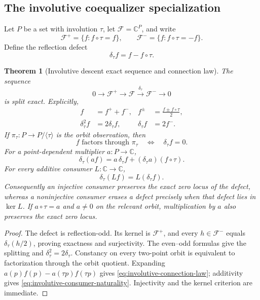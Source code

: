 \documentclass[11pt]{article}
\newtheorem{theorem}{Theorem}[section]
\theoremstyle{definition}
\theoremstyle{remark}
\newcommand{\C}{\mathbb C}
\begin{document}
\subsection{The involutive coequalizer specialization}

Let \(P\) be a set with involution \(\tau\), let
\(\mathcal F=\C^P\), and write
\[
 \mathcal F^+=\{f:f\circ\tau=f\},\qquad
 \mathcal F^-=\{f:f\circ\tau=-f\}.
\]
Define the reflection defect
\[
                  \delta_\tau f=f-f\circ\tau.
\tag{4.17A0}\label{eq:involutive-descent-defect}
\]

\begin{theorem}[Involutive descent exact sequence and connection law]
\label{thm:involutive-descent}
The sequence
\[
 0\longrightarrow\mathcal F^+
 \longrightarrow\mathcal F
 \xrightarrow{\ \delta_\tau\ }\mathcal F^-
 \longrightarrow0
\tag{4.17A1}\label{eq:involutive-descent-exact-sequence}
\]
is split exact.  Explicitly,
\begin{align}
 f&=f^++f^-,
 &f^\pm&=\frac{f\pm f\circ\tau}{2},
\tag{4.17A2}\label{eq:involutive-even-odd-split}\\
 \delta_\tau^2f&=2\delta_\tau f,
 &\delta_\tau f&=2f^- .
\tag{4.17A3}\label{eq:involutive-defect-projector}
\end{align}
If \(\pi_\tau:P\to P/\langle\tau\rangle\) is the orbit observation, then
\[
 f\text{ factors through }\pi_\tau
 \quad\Longleftrightarrow\quad
 \delta_\tau f=0.
\tag{4.17A4}\label{eq:involutive-orbit-factorization}
\]
For a point-dependent multiplier \(a:P\to\C\),
\[
 \boxed{\quad
 \delta_\tau(af)
   =a\,\delta_\tau f+(\delta_\tau a)(f\circ\tau).
 \quad}
\tag{4.17A5}\label{eq:involutive-connection-law}
\]
For every additive consumer \(L:\C\to\C\),
\[
                 \delta_\tau(Lf)=L(\delta_\tau f).
\tag{4.17A6}\label{eq:involutive-consumer-naturality}
\]
Consequently an injective consumer preserves the exact zero locus of the
defect, whereas a noninjective consumer erases a defect precisely when that
defect lies in \(\ker L\).  If \(a\circ\tau=a\) and \(a\ne0\) on the
relevant orbit, multiplication by \(a\) also preserves the exact zero
locus.
\end{theorem}

\begin{proof}
The defect is reflection-odd.  Its kernel is \(\mathcal F^+\), and every
\(h\in\mathcal F^-\) equals
\(\delta_\tau(h/2)\), proving exactness and surjectivity.  The even--odd
formulas give the splitting and
\(\delta_\tau^2=2\delta_\tau\).  Constancy on every two-point orbit is
equivalent to factorization through the orbit quotient.  Expanding
\(a(p)f(p)-a(\tau p)f(\tau p)\) gives
\eqref{eq:involutive-connection-law}; additivity gives
\eqref{eq:involutive-consumer-naturality}.  Injectivity and the kernel
criterion are immediate.
\end{proof}
\end{document}

